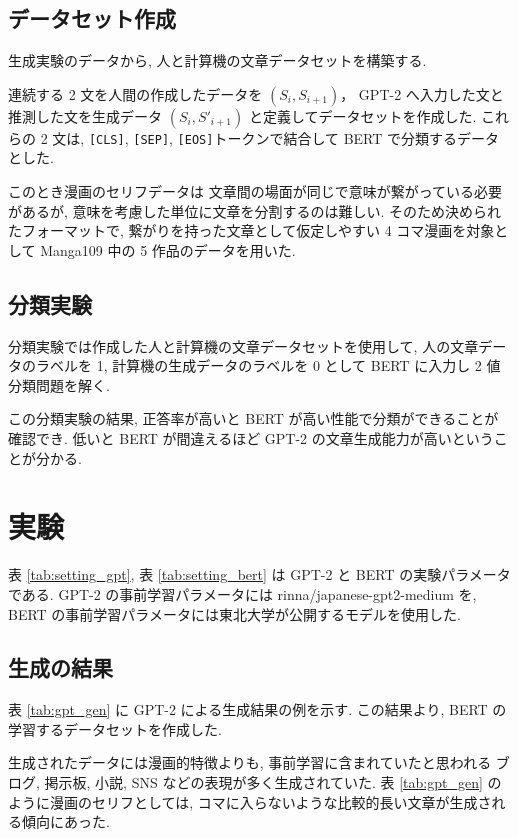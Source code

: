 \documentclass[twocolumn]{jarticle}     %
\begin{document}
\subsection{データセット作成}

生成実験のデータから, 人と計算機の文章データセットを構築する.

連続する 2 文を人間の作成したデータを $(S_i, S_{i+1})$，
GPT-2 へ入力した文と推測した文を生成データ $(S_i, S'_{i+1})$
と定義してデータセットを作成した.
これらの 2 文は, \verb|[CLS]|, \verb|[SEP]|, \verb|[EOS]|トークンで結合して BERT で分類するデータとした.

このとき漫画のセリフデータは
文章間の場面が同じで意味が繋がっている必要があるが, 意味を考慮した単位に文章を分割するのは難しい.
そのため決められたフォーマットで, 繋がりを持った文章として仮定しやすい 4 コマ漫画を対象として
Manga109 中の 5 作品のデータを用いた.

\subsection{分類実験}
分類実験では作成した人と計算機の文章データセットを使用して, 人の文章データのラベルを 1, 計算機の生成データのラベルを 0 として BERT に入力し 2 値分類問題を解く.

この分類実験の結果, 正答率が高いと BERT が高い性能で分類ができることが確認でき.
低いと BERT が間違えるほど GPT-2 の文章生成能力が高いということが分かる.


\section{実験}

表 \ref{tab:setting_gpt}, 表 \ref{tab:setting_bert} は GPT-2 と BERT の実験パラメータである.
GPT-2 の事前学習パラメータには rinna/japanese-gpt2-medium を, BERT の事前学習パラメータには東北大学が公開するモデルを使用した.


\subsection{生成の結果}

表 \ref{tab:gpt_gen} に GPT-2 による生成結果の例を示す.
この結果より, BERT の学習するデータセットを作成した.

生成されたデータには漫画的特徴よりも, 事前学習に含まれていたと思われる ブログ, 掲示板, 小説, SNS などの表現が多く生成されていた.
表 \ref{tab:gpt_gen} のように漫画のセリフとしては, コマに入らないような比較的長い文章が生成される傾向にあった.
\end{document}
